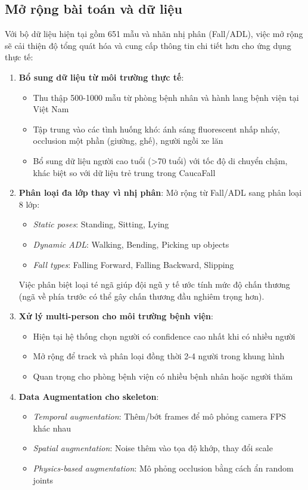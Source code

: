 \subsection{Mở rộng bài toán và dữ liệu}
\label{sec:future_data}

Với bộ dữ liệu hiện tại gồm 651 mẫu và nhãn nhị phân (Fall/ADL), việc mở rộng sẽ cải thiện độ tổng quát hóa và cung cấp thông tin chi tiết hơn cho ứng dụng thực tế:

\begin{enumerate}
    \item \textbf{Bổ sung dữ liệu từ môi trường thực tế}:
    \begin{itemize}
        \item Thu thập 500-1000 mẫu từ phòng bệnh nhân và hành lang bệnh viện tại Việt Nam
        \item Tập trung vào các tình huống khó: ánh sáng fluorescent nhấp nháy, occlusion một phần (giường, ghế), người ngồi xe lăn
        \item Bổ sung dữ liệu người cao tuổi (>70 tuổi) với tốc độ di chuyển chậm, khác biệt so với dữ liệu trẻ trung trong CaucaFall
    \end{itemize}
    
    \item \textbf{Phân loại đa lớp thay vì nhị phân}: Mở rộng từ Fall/ADL sang phân loại 8 lớp:
    \begin{itemize}
        \item \textit{Static poses}: Standing, Sitting, Lying
        \item \textit{Dynamic ADL}: Walking, Bending, Picking up objects
        \item \textit{Fall types}: Falling Forward, Falling Backward, Slipping
    \end{itemize}
    Việc phân biệt loại té ngã giúp đội ngũ y tế ước tính mức độ chấn thương (ngã về phía trước có thể gây chấn thương đầu nghiêm trọng hơn).
    
    \item \textbf{Xử lý multi-person cho môi trường bệnh viện}: 
    \begin{itemize}
        \item Hiện tại hệ thống chọn người có confidence cao nhất khi có nhiều người
        \item Mở rộng để track và phân loại đồng thời 2-4 người trong khung hình
        \item Quan trọng cho phòng bệnh viện có nhiều bệnh nhân hoặc người thăm
    \end{itemize}
    
    \item \textbf{Data Augmentation cho skeleton}:
    \begin{itemize}
        \item \textit{Temporal augmentation}: Thêm/bớt frames để mô phỏng camera FPS khác nhau
        \item \textit{Spatial augmentation}: Noise thêm vào tọa độ khớp, thay đổi scale
        \item \textit{Physics-based augmentation}: Mô phỏng occlusion bằng cách ẩn random joints
    \end{itemize}
\end{enumerate}

